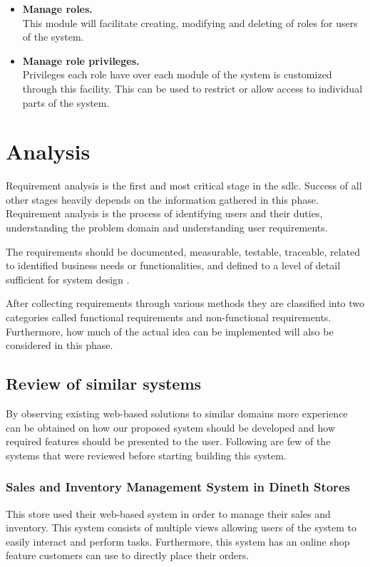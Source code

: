 \documentclass[12pt]{report}
\begin{document}
\begin{itemize}
	\item {\bf{Manage roles.}}\\
	      This module will facilitate creating, modifying and deleting of roles for users of the system.

	\item {\bf{Manage role privileges.}}\\
	      Privileges each role have over each module of the system is customized through this facility. This can be used to restrict or allow access to individual parts of the system.
\end{itemize}

\newpage
\chapter{Analysis}

Requirement analysis is the first and most critical stage in the \acrlong{sdlc}. Success of all other stages heavily depends on the information gathered in this phase. Requirement analysis is the process of identifying users and their duties, understanding the problem domain and understanding user requirements.

The requirements should be documented, measurable, testable, traceable, related to identified business needs or functionalities, and defined to a level of detail sufficient for system design \cite{sommerville_2008_software}.

After collecting requirements through various methods they are classified into two categories called functional requirements and non-functional requirements. Furthermore, how much of the actual idea can be implemented will also be considered in this phase.

\section{Review of similar systems}
By observing existing web-based solutions to similar domains  more experience can be obtained on how our proposed system should be developed and how required features should be presented to the user.  Following are few of the systems that were reviewed before starting building this system.

\subsection{Sales and Inventory Management System in Dineth Stores}
This store used their web-based system in order to manage their sales and inventory. This system consists of multiple views allowing users of the system to easily interact and perform tasks.  Furthermore, this system has an online shop feature customers can use to directly place their orders.
\end{document}
